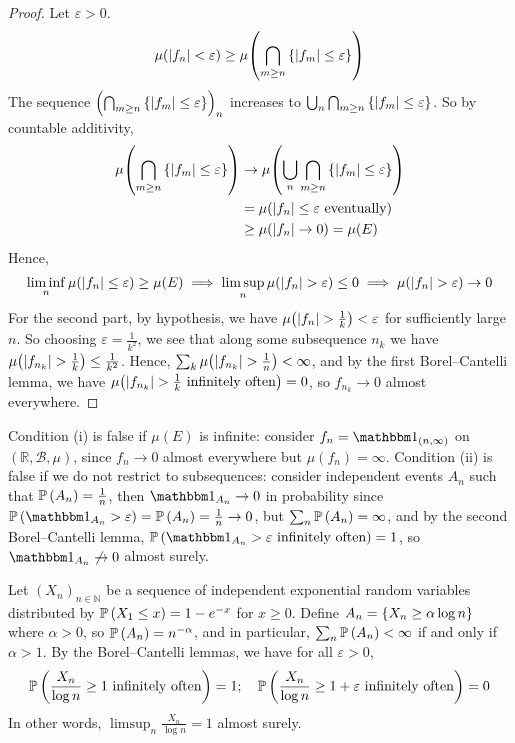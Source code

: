 \begin{proof}
	Let \( \varepsilon > 0 \).
	\[ \mu(\abs{f_n} < \varepsilon) \geq \mu\qty(\bigcap_{m \geq n} \qty{\abs{f_m} \leq \varepsilon}) \]
	The sequence \( \qty(\bigcap_{m \geq n} \qty{\abs{f_m} \leq \varepsilon})_n \) increases to \( \bigcup_n \bigcap_{m \geq n} \qty{\abs{f_m} \leq \varepsilon} \).
	So by countable additivity,
	\begin{align*}
		\mu\qty(\bigcap_{m \geq n} \qty{\abs{f_m} \leq \varepsilon}) &\to \mu\qty(\bigcup_n \bigcap_{m \geq n} \qty{\abs{f_m} \leq \varepsilon}) \\
		&= \mu\qty(\abs{f_n} \leq \varepsilon \text{ eventually}) \\
		&\geq \mu(\abs{f_n} \to 0) = \mu(E)
	\end{align*}
	Hence,
	\[ \liminf_n \mu(\abs{f_n} \leq \varepsilon) \geq \mu(E) \implies \limsup_n \mu(\abs{f_n} > \varepsilon) \leq 0 \implies \mu(\abs{f_n} > \varepsilon) \to 0 \]
	For the second part, by hypothesis, we have \( \mu\qty(\abs{f_n} > \frac{1}{k}) < \varepsilon \) for sufficiently large \( n \).
	So choosing \( \varepsilon = \frac{1}{k^2} \), we see that along some subsequence \( n_k \) we have \( \mu\qty(\abs{f_{n_k}} > \frac{1}{k}) \leq \frac{1}{k^2} \).
	Hence, \( \sum_k \mu\qty(\abs{f_{n_k}} > \frac{1}{n}) < \infty \), and by the first Borel--Cantelli lemma, we have \( \mu\qty(\abs{f_{n_k}} > \frac{1}{k} \text{ infinitely often}) = 0 \), so \( f_{n_k} \to 0 \) almost everywhere.
\end{proof}
\begin{remark}
	Condition (i) is false if \( \mu(E) \) is infinite: consider \( f_n = \mathbbm 1_{(n,\infty)} \) on \( (\mathbb R,\mathcal B,\mu) \), since \( f_n \to 0 \) almost everywhere but \( \mu(f_n) = \infty \).
	Condition (ii) is false if we do not restrict to subsequences: consider independent events \( A_n \) such that \( \mathbb{P}\left({A_n}\right) = \frac{1}{n} \), then \( \mathbbm 1_{A_n} \to 0 \) in probability since \( \prob{\mathbbm 1_{A_n} > \varepsilon} = \prob{A_n} = \frac{1}{n} \to 0 \), but \( \sum_n \mathbb{P}\left({A_n}\right) = \infty \), and by the second Borel--Cantelli lemma, \( \prob{\mathbbm 1_{A_n} > \varepsilon \text{ infinitely often}} = 1 \), so \( \mathbbm 1_{A_n} \not\to 0 \) almost surely.
\end{remark}
\begin{example}
	Let \( (X_n)_{n \in \mathbb N} \) be a sequence of independent exponential random variables distributed by \( \mathbb{P}\left({X_1 \leq x}\right) = 1 - e^{-x} \) for \( x \geq 0 \).
	Define \( A_n = \qty{X_n \geq \alpha \log n} \) where \( \alpha > 0 \), so \( \mathbb{P}\left({A_n}\right) = n^{-\alpha} \), and in particular, \( \sum_n \mathbb{P}\left({A_n}\right) < \infty \) if and only if \( \alpha > 1 \).
	By the Borel--Cantelli lemmas, we have for all \( \varepsilon > 0 \),
	\[ \mathbb{P}\left({\frac{X_n}{\log n} \geq 1 \text{ infinitely often}}\right) = 1;\quad \mathbb{P}\left({\frac{X_n}{\log n} \geq 1 + \varepsilon \text{ infinitely often}}\right) = 0 \]
	In other words, \( \limsup_n \frac{X_n}{\log n} = 1 \) almost surely.
\end{example}

